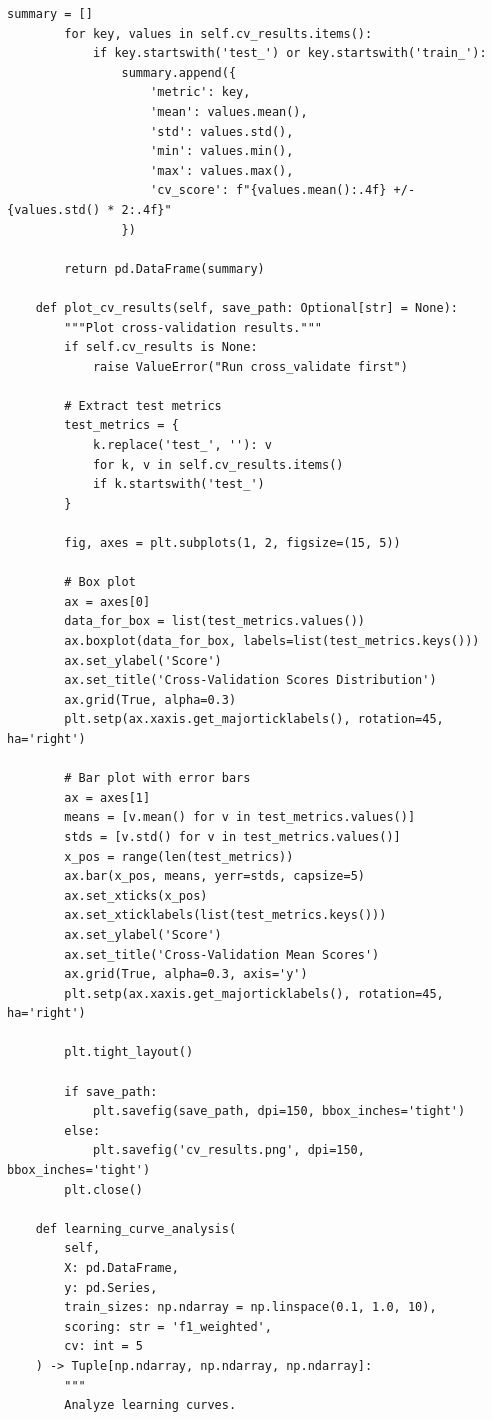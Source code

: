 \begin{lstlisting}[style=python, caption={Production Model Validation Framework}]
        summary = []
        for key, values in self.cv_results.items():
            if key.startswith('test_') or key.startswith('train_'):
                summary.append({
                    'metric': key,
                    'mean': values.mean(),
                    'std': values.std(),
                    'min': values.min(),
                    'max': values.max(),
                    'cv_score': f"{values.mean():.4f} +/- {values.std() * 2:.4f}"
                })

        return pd.DataFrame(summary)

    def plot_cv_results(self, save_path: Optional[str] = None):
        """Plot cross-validation results."""
        if self.cv_results is None:
            raise ValueError("Run cross_validate first")

        # Extract test metrics
        test_metrics = {
            k.replace('test_', ''): v
            for k, v in self.cv_results.items()
            if k.startswith('test_')
        }

        fig, axes = plt.subplots(1, 2, figsize=(15, 5))

        # Box plot
        ax = axes[0]
        data_for_box = list(test_metrics.values())
        ax.boxplot(data_for_box, labels=list(test_metrics.keys()))
        ax.set_ylabel('Score')
        ax.set_title('Cross-Validation Scores Distribution')
        ax.grid(True, alpha=0.3)
        plt.setp(ax.xaxis.get_majorticklabels(), rotation=45, ha='right')

        # Bar plot with error bars
        ax = axes[1]
        means = [v.mean() for v in test_metrics.values()]
        stds = [v.std() for v in test_metrics.values()]
        x_pos = range(len(test_metrics))
        ax.bar(x_pos, means, yerr=stds, capsize=5)
        ax.set_xticks(x_pos)
        ax.set_xticklabels(list(test_metrics.keys()))
        ax.set_ylabel('Score')
        ax.set_title('Cross-Validation Mean Scores')
        ax.grid(True, alpha=0.3, axis='y')
        plt.setp(ax.xaxis.get_majorticklabels(), rotation=45, ha='right')

        plt.tight_layout()

        if save_path:
            plt.savefig(save_path, dpi=150, bbox_inches='tight')
        else:
            plt.savefig('cv_results.png', dpi=150, bbox_inches='tight')
        plt.close()

    def learning_curve_analysis(
        self,
        X: pd.DataFrame,
        y: pd.Series,
        train_sizes: np.ndarray = np.linspace(0.1, 1.0, 10),
        scoring: str = 'f1_weighted',
        cv: int = 5
    ) -> Tuple[np.ndarray, np.ndarray, np.ndarray]:
        """
        Analyze learning curves.


\end{lstlisting}
